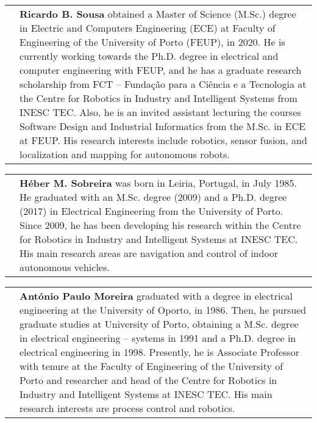 \documentclass[10pt,a4paper,notitlepage,twocolumn,oneside]{article}
\begin{document}
\begin{tabular}{p{} p{}}
\raisebox{-0.925\totalheight}{\texttt{[image: figures/sousa.jpg]}} &
\textbf{Ricardo B. Sousa} obtained a Master of Science (M.Sc.) degree in Electric and Computers Engineering (ECE) at Faculty of Engineering of the University of Porto (FEUP), in 2020.
He is currently working towards the Ph.D. degree in electrical and computer engineering with FEUP, and he has a graduate research scholarship from FCT -- Fundação para a Ciência e a Tecnologia at the Centre for Robotics in Industry and Intelligent Systems from INESC TEC.
Also, he is an invited assistant lecturing the courses Software Design and Industrial Informatics from the M.Sc. in ECE at FEUP.
His research interests include robotics, sensor fusion, and localization and mapping for autonomous robots.\\
\end{tabular}


\begin{tabular}{p{} p{}}
\raisebox{-0.925\totalheight}{\texttt{[image: figures/sobreira.jpg]}} &
\textbf{H\'{e}ber M. Sobreira} was born in Leiria, Portugal, in July 1985. He graduated with an M.Sc. degree (2009) and a Ph.D. degree (2017) in Electrical Engineering from the University of Porto. Since 2009, he has been developing his research within the Centre for Robotics in Industry and Intelligent Systems at INESC TEC. His main research areas are navigation and control of indoor autonomous vehicles.\\
\end{tabular}


\begin{tabular}{p{} p{}}
\raisebox{-0.925\totalheight}{\texttt{[image: figures/moreira.png]}} &
\textbf{Ant\'{o}nio Paulo Moreira} graduated with a degree in electrical engineering at the University of Oporto, in 1986. Then, he pursued graduate studies at University of Porto, obtaining a M.Sc. degree in electrical engineering -- systems in 1991 and a Ph.D. degree in electrical engineering in 1998. Presently, he is Associate Professor with tenure at the Faculty of Engineering of the University of Porto and researcher and head of the Centre for Robotics in Industry and Intelligent Systems at INESC TEC. His main research interests are process control and robotics.\\
\end{tabular}




\cleardoublepage


\end{document}
